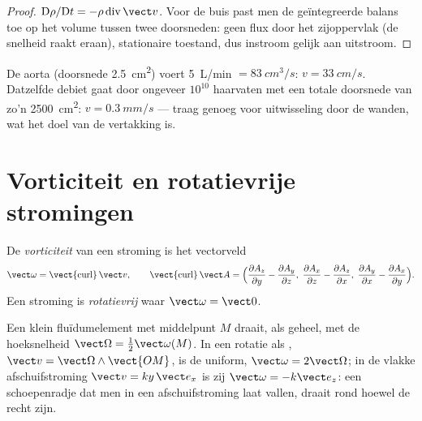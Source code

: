 \begin{proof}
$\mathrm D\rho/\mathrm Dt = -\rho\operatorname{div}\vect v$. Voor de buis
past men de geïntegreerde balans toe op het volume tussen twee doorsneden:
geen flux door het zijoppervlak (de snelheid raakt eraan), stationaire
toestand, dus instroom gelijk aan uitstroom.
\end{proof}

\begin{example}[Bloed]\label{ex:b2:fluid-kinematics:blood}
De aorta (doorsnede \qty{2.5}{cm^2}) voert \qty{5}{L/min}
$= \qty{83}{cm^3/s}$: $v = \qty{33}{cm/s}$. Datzelfde debiet gaat door
ongeveer $10^{10}$ haarvaten met een totale doorsnede van zo'n
\qty{2500}{cm^2}: $v = \qty{0.3}{mm/s}$ --- traag genoeg voor uitwisseling
door de wanden, wat het doel van de vertakking is.
\end{example}

\section{Vorticiteit en rotatievrije stromingen}

\begin{definition}[Vorticiteit]\label{def:b2:fluid-kinematics:vorticity}
De \emph{vorticiteit} van een stroming is het vectorveld
\[
\vect\omega = \operatorname{\vect{curl}}\vect v , \qquad
\operatorname{\vect{curl}}\vect A = \Bigl(\frac{\partial A_z}{\partial y} -
\frac{\partial A_y}{\partial z},\; \frac{\partial A_x}{\partial z} - \frac{\partial A_z}
{\partial x},\; \frac{\partial A_y}{\partial x} - \frac{\partial A_x}{\partial y}\Bigr) .
\]
Een stroming is \emph{rotatievrij} waar $\vect\omega = \vect 0$.
\end{definition}

\begin{proposition}\label{prop:b2:fluid-kinematics:rotation}
Een klein fluïdumelement met middelpunt $M$ draait, als geheel, met de
hoeksnelheid $\vect\Omega = \tfrac12\vect\omega(M)$. In een rotatie als , $\vect v = \vect\Omega\wedge\vect{OM}$, is de  uniform,
$\vect\omega = 2\vect\Omega$; in de vlakke afschuifstroming
$\vect v = ky\,\vect e_x$ is zij $\vect\omega = -k\vect e_z$: een
schoepenradje dat men in een afschuifstroming laat vallen, draait rond
hoewel de  recht zijn.
\end{proposition}

